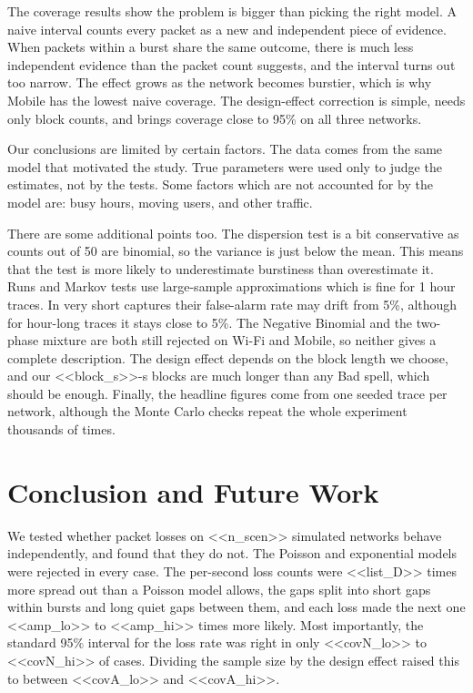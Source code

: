 \documentclass[conference]{IEEEtran}
\begin{document}
The coverage results show the problem is bigger than picking the right model. A naive interval counts every packet as a new and independent piece of evidence. When packets within a burst share the same outcome, there is much less independent evidence than the packet count suggests, and the interval turns out too narrow. The effect grows as the network becomes burstier, which is why Mobile has the lowest naive coverage. The design-effect correction is simple, needs only block counts, and brings coverage close to 95\% on all three networks.

Our conclusions are limited by certain factors. The data comes from the same model that motivated the study. True parameters were used only to judge the estimates, not by the tests. Some factors which are not accounted for by the model are: busy hours, moving users, and other traffic.

There are some additional points too. The dispersion test is a bit conservative as counts out of 50 are binomial, so the variance is just below the mean. This means that the test is more likely to underestimate burstiness than overestimate it. Runs and Markov tests use large-sample approximations which is fine for 1 hour traces. In very short captures their false-alarm rate may drift from 5\%, although for hour-long traces it stays close to 5\%. The Negative Binomial and the two-phase mixture are both still rejected on Wi-Fi and Mobile, so neither gives a complete description. The design effect depends on the block length we choose, and our <<block_s>>-s blocks are much longer than any Bad spell, which should be enough. Finally, the headline figures come from one seeded trace per network, although the Monte Carlo checks repeat the whole experiment thousands of times.

\section{Conclusion and Future Work}
We tested whether packet losses on <<n_scen>> simulated networks behave independently, and found that they do not. The Poisson and exponential models were rejected in every case. The per-second loss counts were <<list_D>> times more spread out than a Poisson model allows, the gaps split into short gaps within bursts and long quiet gaps between them, and each loss made the next one <<amp_lo>> to <<amp_hi>> times more likely. Most importantly, the standard 95\% interval for the loss rate was right in only <<covN_lo>> to <<covN_hi>> of cases. Dividing the sample size by the design effect raised this to between <<covA_lo>> and <<covA_hi>>.
\end{document}
